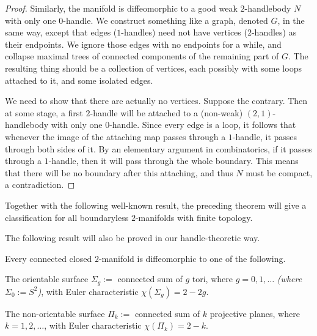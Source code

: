 \begin{proof}
Similarly, the manifold is diffeomorphic to a good weak $2$-handlebody $N$
with only one $0$-handle.
We construct something like a graph, denoted $G$, in the same way,
except that edges ($1$-handles) need not have vertices ($2$-handles) as their endpoints.
We ignore those edges with no endpoints for a while,
and collapse maximal trees of connected components of the remaining part of $G$.
The resulting thing should be a collection of vertices,
each possibly with some loops attached to it,
and some isolated edges.

We need to show that there are actually no vertices.
Suppose the contrary. Then at some stage,
a first $2$-handle will be attached to a (non-weak)
$(2,1)$-handlebody with only one $0$-handle.
Since every edge is a loop, it follows that whenever the image of the attaching map
passes through a $1$-handle, it passes through both sides of it.
By an elementary argument in combinatorics, if it passes through a $1$-handle,
then it will pass through the whole boundary.
This means that there will be no boundary after this attaching,
and thus $N$ must be compact, a contradiction.
\end{proof}

Together with the following well-known result,
the preceding theorem will give a classification for
all boundaryless $2$-manifolds with finite topology.

The following result will also be proved in our handle-theoretic way.

\begin{theorem}
Every connected closed $2$-manifold is diffeomorphic to one of the following.
\begin{enum}
\item The orientable surface $\Sigma_g:=$ connected sum of $g$ tori,
where $g=0,1,\dotsc$ \emph{(where $\Sigma_0:=S^2$)}, with Euler characteristic $\chi(\Sigma_g)=2-2g$.
\item The non-orientable surface $\Pi_k:=$ connected sum of $k$ projective planes,
where $k=1,2,\dotsc$, with Euler characteristic $\chi(\Pi_k)=2-k$.
\end{enum}
\end{theorem}

